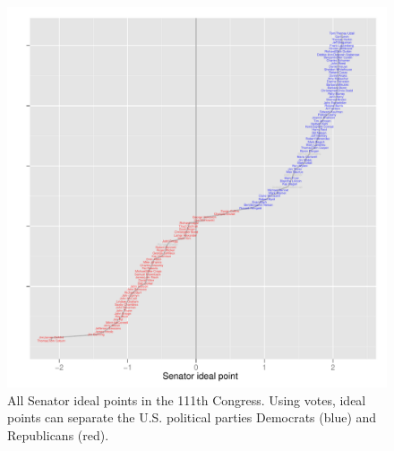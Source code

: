 \begin{figure}[t]
  \includegraphics[width=1.\textwidth]
  {chapter_predicting_votes_with_text/figures/134_senator_name_accuracy_by_ip.pdf}
  \caption{All Senator ideal points in the 111th Congress.  Using
    votes, ideal points can separate the U.S. political parties
    Democrats (blue) and Republicans (red).}
\label{fig:senate_ideal_points}
\end{figure}






